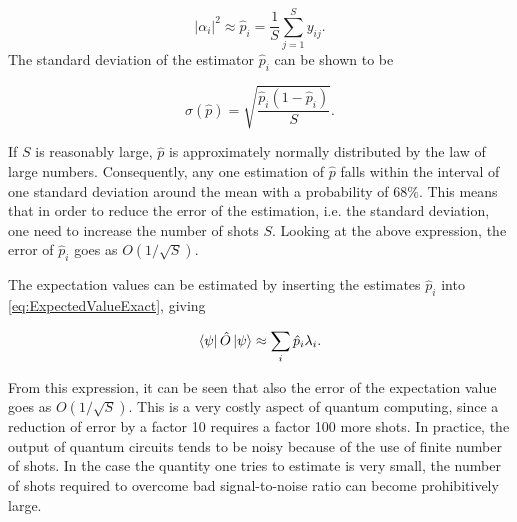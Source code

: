 \begin{equation}
    |\alpha_i|^2 \approx \hat{p}_i = \frac{1}{S}\sum_{j=1}^S y_{ij}.
\end{equation}
The standard deviation of the estimator $\hat{p}_i$ can be shown to be

\begin{equation}
    \sigma(\hat{p}) = \sqrt{\frac{\hat{p}_i(1-\hat{p}_i)}{S}}.
\end{equation}


If $S$ is reasonably large, $\hat{p}$ is approximately normally distributed by the law of large numbers. Consequently, any one estimation of $\hat{p}$ falls within the interval of one standard deviation around the mean with a probability of $68\%$. This means that in order to reduce the error of the estimation, i.e. the standard deviation, one need to increase the number of shots $S$. Looking at the above expression, the error of $\hat{p}_i$ goes as $O(1/\sqrt{S})$. 

The expectation values can be estimated by inserting the estimates $\hat{p}_i$ into \autoref{eq:ExpectedValueExact}, giving

\begin{equation}\label{eq:ExpectedValueEstimate}
    \bra{\psi}\hat{O}\ket{\psi} \approx \sum_{i} \hat{p}_i\lambda_i.
\end{equation}

From this expression, it can be seen that also the error of the expectation value goes as $O(1/\sqrt{S})$. This is a very costly aspect of quantum computing, since a reduction of error by a factor 10  requires a factor 100 more shots. In practice, the output of quantum circuits tends to be noisy because of the use of finite number of shots. In the case the quantity one tries to estimate is very small, the number of shots required to overcome bad signal-to-noise ratio can become prohibitively large.



